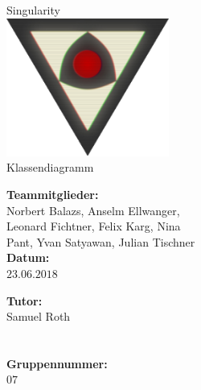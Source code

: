 \documentclass[12pt]{article}
\newcommand{\changefont}[4]{{\fontfamily{#1}\fontsize{#2}{#3}\selectfont #4}} %
\begin{document}
\renewcommand{\figurename}{Fig.}%
\renewcommand{\arraystretch}{1.4}%

\begin{titlepage}
	\begin{center}	
		\changefont{pbk}{32}{35}{Singularity}\\\vspace{3em}
		\includegraphics[width=0.4\textwidth]{res/SingularityLogo2.png}\\\vspace{5em}
		\changefont{cmr}{32}{35}{Klassendiagramm}
	\end{center}
	\vspace{7em}

	\begin{minipage}[t]{.5\textwidth}
		\begin{center}
			\textbf{Teammitglieder:}\\
			\vspace{.5em}
			Norbert Balazs, Anselm Ellwanger,\\
			Leonard Fichtner, Felix Karg, Nina\\
			Pant, Yvan Satyawan, Julian Tischner\\
			\vspace{2em}
			\textbf{Datum:}\\
			\vspace{.5em}
			$23.06.2018$
		\end{center}
	\end{minipage}
	\begin{minipage}[t]{.5\textwidth}
		\begin{center}
			\textbf{Tutor:}\\
			\vspace{.5em}
			Samuel Roth\\
			\quad\\
			\quad\\
			\vspace{2em}
			\textbf{Gruppennummer:}\\
			\vspace{.5em}
			$07$
		\end{center}
	\end{minipage}
\end{titlepage}
\end{document}
